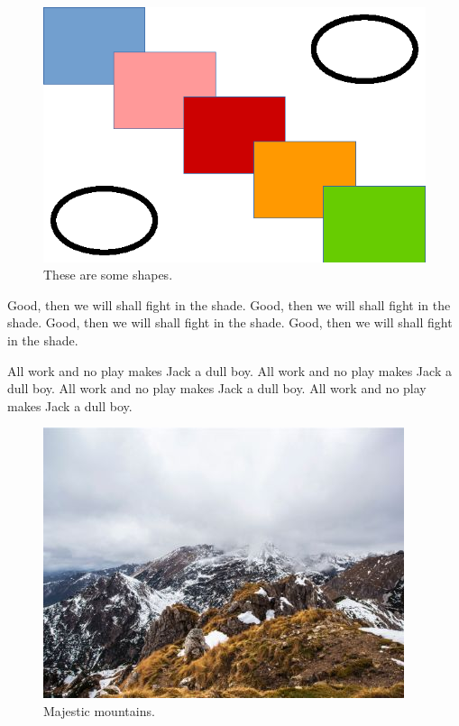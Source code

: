 \documentclass[twocolumn]{article}
\begin{document}
\begin{figure}[h]
\centering
\includegraphics{figures/shapes.eps}
\caption{These are some shapes.}
\label{fig:shapes}
\end{figure}

Good, then we will shall fight in the shade.
Good, then we will shall fight in the shade.
Good, then we will shall fight in the shade.
Good, then we will shall fight in the shade.

All work and no play makes Jack a dull boy.
All work and no play makes Jack a dull boy.
All work and no play makes Jack a dull boy.
All work and no play makes Jack a dull boy.

\begin{figure}[h]
\centering
\includegraphics[width=\linewidth,natwidth=400,natheight=300]{figures/mountains.jpg}
\caption{Majestic mountains.}
\label{fig:mountains}
\end{figure}
\end{document}
